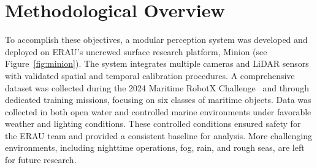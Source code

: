 \documentclass{erauthesis}
\begin{document}



\section{Methodological Overview}

To accomplish these objectives, a modular perception system was developed and deployed on ERAU’s uncrewed surface research platform, Minion (see Figure~\ref{fig:minion}). The system integrates multiple cameras and \ac{LiDAR} sensors with validated spatial and temporal calibration procedures. A comprehensive dataset was collected during the 2024 Maritime RobotX Challenge~\cite{lachguar} and through dedicated training missions, focusing on six classes of maritime objects. Data was collected in both open water and controlled marine environments under favorable weather and lighting conditions. These controlled conditions ensured safety for the ERAU team and provided a consistent baseline for analysis. More challenging environments, including nighttime operations, fog, rain, and rough seas, are left for future research.
\end{document}
